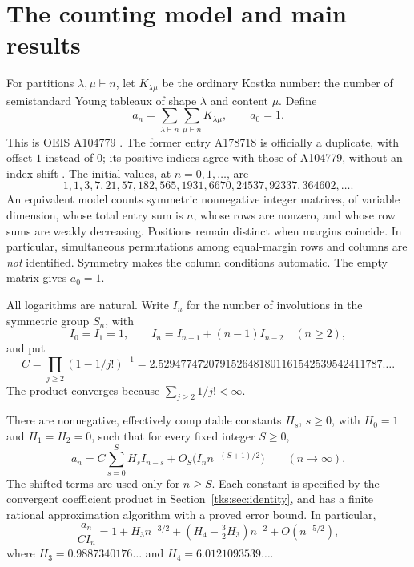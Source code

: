 \section{The counting model and main results}\label{tks:sec:results}
For partitions $\lambda,\mu\vdash n$, let $K_{\lambda\mu}$ be the ordinary Kostka number: the number of semistandard Young tableaux of shape $\lambda$ and content $\mu$. Define
\begin{equation}\label{tks:eq:defa}
a_n=\sum_{\lambda\vdash n}\sum_{\mu\vdash n}K_{\lambda\mu},\qquad a_0=1.
\end{equation}
This is OEIS A104779 \cite{A104779}. The former entry A178718 is officially a duplicate, with offset $1$ instead of $0$; its positive indices agree with those of A104779, without an index shift \cite{A178718}. The initial values, at $n=0,1,\ldots$, are
\[
1,1,3,7,21,57,182,565,1931,6670,24537,92337,364602,\ldots.
\]
An equivalent model counts symmetric nonnegative integer matrices, of variable dimension, whose total entry sum is $n$, whose rows are nonzero, and whose row sums are weakly decreasing. Positions remain distinct when margins coincide. In particular, simultaneous permutations among equal-margin rows and columns are \emph{not} identified. Symmetry makes the column conditions automatic. The empty matrix gives $a_0=1$.

All logarithms are natural. Write $I_n$ for the number of involutions in the symmetric group $S_n$, with
\begin{equation}\label{tks:eq:involutionrec}
I_0=I_1=1,\qquad I_n=I_{n-1}+(n-1)I_{n-2}\quad(n\geq2),
\end{equation}
and put
\begin{equation}\label{tks:eq:Cintro}
C=\prod_{j\geq2}(1-1/j!)^{-1}
  =2.5294774720791526481801161542539542411787\ldots.
\end{equation}
The product converges because $\sum_{j\geq2}1/j!<\infty$.

\begin{theorem}\label{tks:thm:main}
There are nonnegative, effectively computable constants $H_s$, $s\geq0$, with $H_0=1$ and $H_1=H_2=0$, such that for every fixed integer $S\geq0$,
\begin{equation}\label{tks:eq:main}
a_n=C\sum_{s=0}^{S}H_s I_{n-s}
       +O_S\bigl(I_n n^{-(S+1)/2}\bigr)\qquad(n\to\infty).
\end{equation}
The shifted terms are used only for $n\geq S$. Each constant is specified by the convergent coefficient product in Section~\ref{tks:sec:identity}, and has a finite rational approximation algorithm with a proved error bound. In particular,
\begin{equation}\label{tks:eq:firstrelative}
\frac{a_n}{CI_n}=1+H_3n^{-3/2}
 +(H_4-\tfrac32H_3)n^{-2}+O(n^{-5/2}),
\end{equation}
where $H_3=0.9887340176\ldots$ and $H_4=6.0121093539\ldots$.
\end{theorem}

